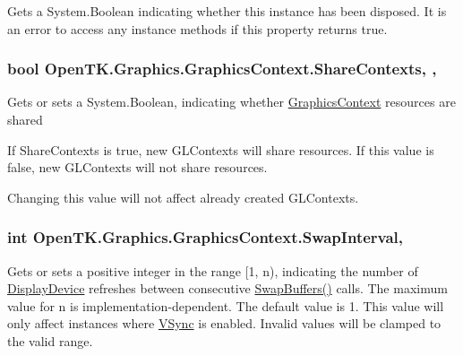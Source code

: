 Gets a System.\-Boolean indicating whether this instance has been disposed. It is an error to access any instance methods if this property returns true. 

\hypertarget{class_open_t_k_1_1_graphics_1_1_graphics_context_a83e5259c2dd10556b3c485f2e8a00494}{
\subsubsection[{Share\-Contexts}]{\setlength{\rightskip}{0pt plus 5cm}bool Open\-T\-K.\-Graphics.\-Graphics\-Context.\-Share\-Contexts\hspace{0.3cm}{\ttfamily [static]}, {\ttfamily [get]}, {\ttfamily [set]}}}\label{class_open_t_k_1_1_graphics_1_1_graphics_context_a83e5259c2dd10556b3c485f2e8a00494}


Gets or sets a System.\-Boolean, indicating whether \hyperlink{class_open_t_k_1_1_graphics_1_1_graphics_context}{Graphics\-Context} resources are shared

If Share\-Contexts is true, new G\-L\-Contexts will share resources. If this value is false, new G\-L\-Contexts will not share resources.

Changing this value will not affect already created G\-L\-Contexts.\hypertarget{class_open_t_k_1_1_graphics_1_1_graphics_context_a860ca9db2d767d969b0b5a6c9b7b0f46}{
\subsubsection[{Swap\-Interval}]{\setlength{\rightskip}{0pt plus 5cm}int Open\-T\-K.\-Graphics.\-Graphics\-Context.\-Swap\-Interval\hspace{0.3cm}{\ttfamily [get]}, {\ttfamily [set]}}}\label{class_open_t_k_1_1_graphics_1_1_graphics_context_a860ca9db2d767d969b0b5a6c9b7b0f46}


Gets or sets a positive integer in the range \mbox{[}1, n), indicating the number of \hyperlink{class_open_t_k_1_1_display_device}{Display\-Device} refreshes between consecutive \hyperlink{class_open_t_k_1_1_graphics_1_1_graphics_context_ab73c61bea26369cf76dff2165f5084cf}{Swap\-Buffers()} calls. The maximum value for n is implementation-\/dependent. The default value is 1. This value will only affect instances where \hyperlink{class_open_t_k_1_1_graphics_1_1_graphics_context_a502b2543a983bba6ceba9762212e290b}{V\-Sync} is enabled. Invalid values will be clamped to the valid range. 

